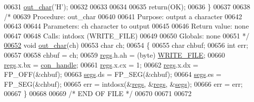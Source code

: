 \begin{DoxyCode}
00631         \hyperlink{trmdrive_8c_a46f4cf8a0c8928f76d9d25f530a9ac7e}{out_char}(\textcolor{charliteral}{'H'});
00632 
00633 
00634 
00635         \textcolor{keywordflow}{return}(OK);
00636 \}
00637 
00638 \textcolor{comment}{/*}
00639 \textcolor{comment}{        Procedure: out\_char}
00640 \textcolor{comment}{}
00641 \textcolor{comment}{        Purpose: output a character}
00642 \textcolor{comment}{}
00643 \textcolor{comment}{}
00644 \textcolor{comment}{        Parameters: ch  character to output}
00645 \textcolor{comment}{}
00646 \textcolor{comment}{        Return value: none}
00647 \textcolor{comment}{}
00648 \textcolor{comment}{        Calls:  intdosx (WRITE\_FILE)}
00649 \textcolor{comment}{}
00650 \textcolor{comment}{        Globals: none}
00651 \textcolor{comment}{*/}
\hypertarget{trmdrive_8c_source_l00652}{}\hyperlink{trmdrive_8c_a46f4cf8a0c8928f76d9d25f530a9ac7e}{00652} \textcolor{keywordtype}{void} \hyperlink{trmdrive_8c_a46f4cf8a0c8928f76d9d25f530a9ac7e}{out_char}(ch)
00653 char ch;
00654 \{
00655         \textcolor{keywordtype}{char}    chbuf;
00656         \textcolor{keywordtype}{int}     err;
00657 
00658         chbuf = ch;
00659         \hyperlink{trmdrive_8c_aaf347d1f75c4caba1a02aa49afc9324d}{regs}.h.ah = (byte) \hyperlink{trmdrive_8c_afa3f0ba7c4f5385d75bcce6005b6ad23}{WRITE_FILE};
00660         \hyperlink{trmdrive_8c_aaf347d1f75c4caba1a02aa49afc9324d}{regs}.x.bx = \hyperlink{trmdrive_8c_a679f108c9d4e6b006d00e83ec2a4aa96}{con_handle};
00661         \hyperlink{trmdrive_8c_aaf347d1f75c4caba1a02aa49afc9324d}{regs}.x.cx = 1;
00662         \hyperlink{trmdrive_8c_aaf347d1f75c4caba1a02aa49afc9324d}{regs}.x.dx = FP\_OFF(&chbuf);
00663         \hyperlink{trmdrive_8c_a6d1d66d9778cd1920c9001dac5712514}{segs}.ds = FP\_SEG(&chbuf);
00664         \hyperlink{trmdrive_8c_a6d1d66d9778cd1920c9001dac5712514}{segs}.es = FP\_SEG(&chbuf);
00665         err = intdosx(&\hyperlink{trmdrive_8c_aaf347d1f75c4caba1a02aa49afc9324d}{regs}, &\hyperlink{trmdrive_8c_aaf347d1f75c4caba1a02aa49afc9324d}{regs}, &\hyperlink{trmdrive_8c_a6d1d66d9778cd1920c9001dac5712514}{segs});
00666         err = err;
00667 \}
00668 
00669 \textcolor{comment}{/* END OF FILE */}
00670 
00671 
00672 
\end{DoxyCode}
